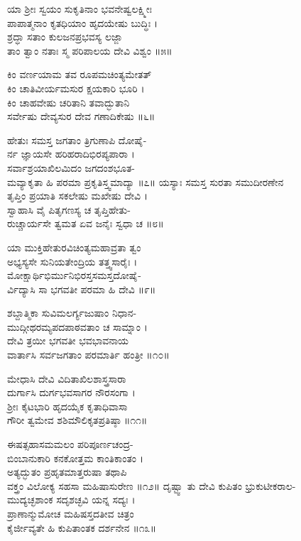      ಯಾ ಶ್ರೀಃ ಸ್ವಯಂ ಸುಕೃತಿನಾಂ ಭವನೇಷ್ವಲಕ್ಷ್ಮೀಃ\\
ಪಾಪಾತ್ಮನಾಂ ಕೃತಧಿಯಾಂ ಹೃದಯೇಷು ಬುದ್ಧಿಃ ।\\
     ಶ್ರದ್ಧಾ ಸತಾಂ ಕುಲಜನಪ್ರಭವಸ್ಯ ಲಜ್ಜಾ\\
ತಾಂ ತ್ವಾಂ ನತಾಃ ಸ್ಮ ಪರಿಪಾಲಯ ದೇವಿ ವಿಶ್ವಂ ॥೫॥

     ಕಿಂ ವರ್ಣಯಾಮ ತವ ರೂಪಮಚಿಂತ್ಯಮೇತತ್\\
ಕಿಂ ಚಾತಿವೀರ್ಯಮಸುರ ಕ್ಷಯಕಾರಿ ಭೂರಿ ।\\
     ಕಿಂ ಚಾಹವೇಷು ಚರಿತಾನಿ ತವಾದ್ಭುತಾನಿ\\
ಸರ್ವೇಷು ದೇವ್ಯಸುರ ದೇವ ಗಣಾದಿಕೇಷು ॥೬॥

     ಹೇತುಃ ಸಮಸ್ತ ಜಗತಾಂ ತ್ರಿಗುಣಾಪಿ ದೋಷೈ-\\
ರ್ನ ಜ್ಞಾಯಸೇ ಹರಿಹರಾದಿಭಿರಪ್ಯಪಾರಾ ।\\
     ಸರ್ವಾಶ್ರಯಾಖಿಲಮಿದಂ ಜಗದಂಶಭೂತ-\\
ಮವ್ಯಾಕೃತಾ ಹಿ ಪರಮಾ ಪ್ರಕೃತಿಸ್ತ್ವಮಾದ್ಯಾ ॥೭॥
\newpage
     ಯಸ್ಯಾಃ ಸಮಸ್ತ ಸುರತಾ ಸಮುದೀರಣೇನ\\
ತೃಪ್ತಿಂ ಪ್ರಯಾತಿ ಸಕಲೇಷು ಮಖೇಷು ದೇವಿ ।\\
     ಸ್ವಾಹಾಸಿ ವೈ ಪಿತೃಗಣಸ್ಯ ಚ ತೃಪ್ತಿಹೇತು-\\
ರುಚ್ಚಾರ್ಯಸೇ ತ್ವಮತ ಏವ ಜನೈಃ ಸ್ವಧಾ ಚ ॥೮॥

     ಯಾ ಮುಕ್ತಿಹೇತುರವಿಚಿಂತ್ಯಮಹಾವ್ರತಾ ತ್ವಂ\\
ಅಭ್ಯಸ್ಯಸೇ ಸುನಿಯತೇಂದ್ರಿಯ ತತ್ತ್ವಸಾರೈಃ ।\\
     ಮೋಕ್ಷಾರ್ಥಿಭಿರ್ಮುನಿಭಿರಸ್ತಸಮಸ್ತದೋಷೈ-\\
ರ್ವಿದ್ಯಾಸಿ ಸಾ ಭಗವತೀ ಪರಮಾ ಹಿ ದೇವಿ ॥೯॥

     ಶಬ್ದಾತ್ಮಿಕಾ ಸುವಿಮಲರ್ಗ್ಯಜುಷಾಂ ನಿಧಾನ-\\
ಮುದ್ಗೀಥರಮ್ಯಪದಪಾಠವತಾಂ ಚ ಸಾಮ್ನಾಂ ।\\
     ದೇವಿ ತ್ರಯೀ ಭಗವತೀ ಭವಭಾವನಾಯ\\
ವಾರ್ತಾಸಿ ಸರ್ವಜಗತಾಂ ಪರಮಾರ್ತಿ ಹಂತ್ರೀ ॥೧೦॥

     ಮೇಧಾಸಿ ದೇವಿ ವಿದಿತಾಖಿಲಶಾಸ್ತ್ರಸಾರಾ\\
ದುರ್ಗಾಸಿ ದುರ್ಗಭವಸಾಗರ ನೌರಸಂಗಾ ।\\
     ಶ್ರೀಃ ಕೈಟಭಾರಿ ಹೃದಯೈಕ ಕೃತಾಧಿವಾಸಾ\\
ಗೌರೀ ತ್ವಮೇವ ಶಶಿಮೌಲಿಕೃತಪ್ರತಿಷ್ಠಾ ॥೧೧॥

     ಈಷತ್ಸಹಾಸಮಮಲಂ ಪರಿಪೂರ್ಣಚಂದ್ರ-\\
ಬಿಂಬಾನುಕಾರಿ ಕನಕೋತ್ತಮ ಕಾಂತಿಕಾಂತಂ ।\\
     ಅತ್ಯದ್ಭುತಂ ಪ್ರಹೃತಮಾತ್ತರುಷಾ ತಥಾಪಿ\\
ವಕ್ತ್ರಂ ವಿಲೋಕ್ಯ ಸಹಸಾ ಮಹಿಷಾಸುರೇಣ ॥೧೨॥
\newpage
     ದೃಷ್ಟ್ವಾ ತು ದೇವಿ ಕುಪಿತಂ ಭ್ರುಕುಟೀಕರಾಲ-\\
ಮುದ್ಯಚ್ಛಶಾಂಕ ಸದೃಶಚ್ಛವಿ ಯನ್ನ ಸದ್ಯಃ ।\\
     ಪ್ರಾಣಾನ್ಮುಮೋಚ ಮಹಿಷಸ್ತದತೀವ ಚಿತ್ರಂ\\
ಕೈರ್ಜೀವ್ಯತೇ ಹಿ ಕುಪಿತಾಂತಕ ದರ್ಶನೇನ ॥೧೩॥

